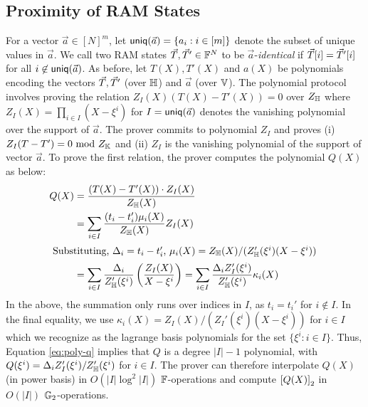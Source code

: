 \subsection{Proximity of RAM States}\label{subsec:proximity-ram}
For a vector $\vec{a}\in [N]^m$, let $\mathsf{uniq}(\vec{{a}})=\{a_i: i\in [m]\}$ denote the subset of unique values in $\vec{a}$. We call two
RAM states $\vec{T}, \vec{T}'\in \mathbb{F}^N$ to be $\vec{a}$-{\em identical} if $\vec{T}[i]=\vec{T}'[i]$ for all $i\not\in\mathsf{uniq}(\vec{{a}})$. As before,
let $T(X),T'(X)$ and $a(X)$ be polynomials encoding the vectors $\vec{T},\vec{T}'$ (over $\mathbb{H}$) and $\vec{a}$ (over $\mathbb{V}$). The
polynomial protocol involves proving the relation $Z_I(X)(T(X) - T'(X)) = 0$ over $Z_{\mathbb{H}}$ where $Z_I(X)=\prod_{i\in I}(X-\xi^i)$
for $I=\mathsf{uniq}(\vec{{a}})$ denotes the vanishing polynomial over the support of $\vec{a}$.
The prover commits to polynomial $Z_I$ and proves (i) $Z_I(T - T') = 0 \text{ mod } Z_{\mathbb{K}}$ and (ii) $Z_I$ is the vanishing
polynomial of the support of vector $\vec{a}$. To prove the first relation, the prover computes the polynomial $Q(X)$ as below:
\begin{align}\label{eq:poly-q}
Q(X) &= \frac{(T(X)-T'(X))\cdot Z_I(X)}{Z_{\mathbb{H}}(X)} \nonumber \\
&= \sum_{i\in I}\frac{(t_i - t_i')\mu_i(X)}{Z_{\mathbb{H}}(X)} Z_I(X) \nonumber \\
\intertext{ Substituting, $\Delta_i=t_i-t_i'$, $\mu_i(X)=Z_\mathbb{H}(X)/(Z_\mathbb{H}'(\xi^i)(X-\xi^i))$ }
&=\sum_{i\in I}\frac{\Delta_i}{Z_{\mathbb{H}}'(\xi^i)}\left(\frac{Z_I(X)}{X-\xi^i}\right) = \sum_{i\in I}\frac{\Delta_i Z_I'(\xi^i)}{Z_{\mathbb{H}}'(\xi^i)}\kappa_i(X)
\end{align}
In the above, the summation only runs over indices in $I$, as $t_i=t_i'$ for $i\not\in I$. In the final equality, we use
$\kappa_i(X) = Z_I(X)/(Z_I'(\xi^i)(X-\xi^i))$ for $i\in I$ which we recognize as the lagrange basis polynomials for the set
$\{\xi^i: i\in I\}$. Thus, Equation \eqref{eq:poly-q} implies that $Q$ is a degree $|I|-1$ polynomial, with
$Q(\xi^i)=\Delta_i Z_I'(\xi^i)/Z_\mathbb{H}'(\xi^i)$ for $i\in I$. The prover can therefore interpolate $Q(X)$ (in power basis)
in $O(|I|\log^2 |I|)$ $\mathbb{F}$-operations and compute $\left[{Q(X)}\right]_2$ in $O(|I|)$ $\mathbb{G}_2$-operations.

